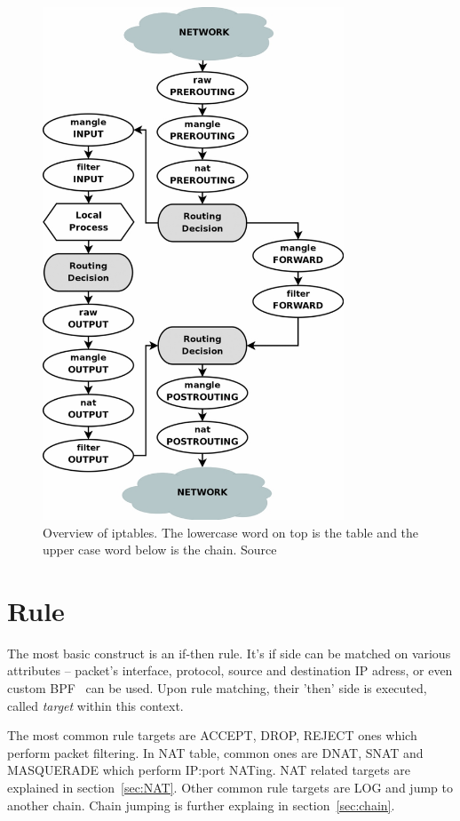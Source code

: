 \documentclass[times, utf8, seminar, english]{fer}
\begin{document}
\begin{figure}
    \centering
    \includegraphics[width=0.8\textwidth]{tables_traverse}
    \caption{Overview of iptables. The lowercase word on top is the table and the upper case word below is the chain. Source~\cite{Iptables99:online}}
    \label{fig:iptables_traverse}
\end{figure}

\section{Rule}
    The most basic construct is an if-then rule. It's if side can be matched on various attributes -- packet's interface, protocol, source and destination IP adress, or even custom BPF~\cite{BPFthefo6:online} can be used. Upon rule matching, their 'then' side is executed, called \emph{target} within this context.

    The most common rule targets are ACCEPT, DROP, REJECT ones which perform packet filtering. In NAT table, common ones are DNAT, SNAT and MASQUERADE which perform IP:port NATing. NAT related targets are explained in section~\ref{sec:NAT}. Other common rule targets are LOG and jump to another chain. Chain jumping is further explaing in section~\ref{sec:chain}.
\end{document}
